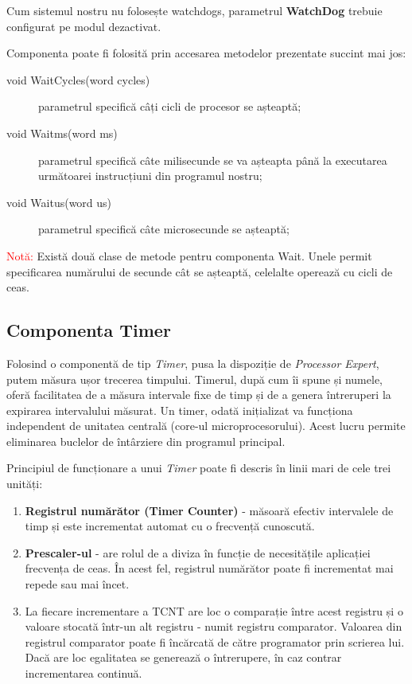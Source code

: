 Cum sistemul nostru nu folosește watchdogs, parametrul \textbf{WatchDog} trebuie configurat pe modul dezactivat.

Componenta poate fi folosită prin accesarea metodelor prezentate succint mai jos:

\begin{description}
    \item[void WaitCycles(word cycles)] parametrul specifică câți cicli de procesor se așteaptă;
    \item[void Waitms(word ms)] parametrul specifică câte milisecunde se va așteapta până la executarea următoarei instrucțiuni din programul nostru;
    \item[void Waitus(word us)] parametrul specifică câte microsecunde se așteaptă;
\end{description}

\textcolor{red}{Notă:} Există două clase de metode pentru componenta Wait. Unele permit specificarea numărului de secunde cât se așteaptă, celelalte operează cu cicli de ceas.

\subsection{Componenta Timer}

Folosind o componentă de tip \textit{Timer}, pusa la dispoziție de \textit{Processor Expert}, putem măsura ușor trecerea timpului. Timerul, după cum îi spune și numele, oferă facilitatea de a măsura intervale fixe de timp și de a genera întreruperi la expirarea intervalului măsurat. Un timer, odată inițializat va funcționa independent de unitatea centrală (core-ul microprocesorului). Acest lucru permite eliminarea buclelor de întârziere din programul principal.

Principiul de funcționare a unui \textit{Timer} poate fi descris în linii mari de cele trei unități:

\begin{enumerate}
    \item \textbf{Registrul numărător (Timer Counter)} - măsoară efectiv intervalele de timp și este incrementat automat cu o frecvență cunoscută.
    \item \textbf{Prescaler-ul} - are rolul de a diviza în funcție de necesitățile aplicației frecvența de ceas. În acest fel, registrul numărător poate fi incrementat mai repede sau mai încet.
    \item La fiecare incrementare a TCNT are loc o comparație între acest registru și o valoare stocată într-un alt registru - numit registru comparator. Valoarea din registrul comparator poate fi încărcată de către programator prin scrierea lui. Dacă are loc egalitatea se generează o întrerupere, în caz contrar incrementarea continuă.
\end{enumerate}

